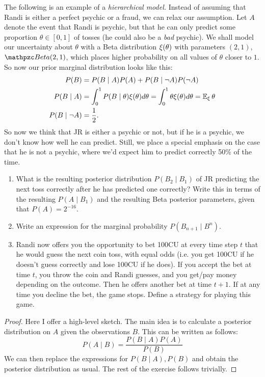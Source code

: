\documentclass[twoside,a4paper]{article}
\begin{document}
\begin{exercise}
  The following is an example of a \emph{hierarchical model.}
  Instead of assuming that Randi is either a perfect psychic or a fraud, we can relax our assumption. Let $A$ denote the event that Randi is psychic, but that he can only predict some proportion $\theta \in [0,1]$ of tosses (he could also be a \emph{bad} psychic).
We shall model our uncertainty about $\theta$ with a Beta distribution $\xi(\theta)$ with parameters $(2, 1)$, $\Beta(2,1)$, which places higher probability on all values of $\theta$ closer to $1$. So now our prior marginal distribution looks like this:
\begin{align}
  P(B) &= P(B \mid A) P(A) + P(B \mid \neg A) P(\neg A)\\
  P(B \mid A) &= \int_0^1 P(B \mid \theta) \xi(\theta) d\theta = \int_0^1 \theta \xi(\theta) d\theta = \mathop{\mbox{\ensuremath{\mathbb{E}}}}\nolimits_\xi \theta\\
  P(B \mid \neg A) &= \frac{1}{2}.
\end{align}
So now we think that JR is either a psychic or not, but if he is a psychic, we don't know how well he can predict. Still, we place a special emphasis on the case that he is not a psychic, where we'd expect him to predict correctly 50\% of the time.
\begin{enumerate}
\item What is the resulting posterior distribution $P(B_2 \mid B_1)$ of JR predicting the next toss correctly after he has predicted one correctly? Write this in terms of the resulting $P(A \mid B_1)$ and the resulting Beta posterior parameters, given that $P(A) = 2^{-16}$.
\item Write an expression for the marginal probability $P(B_{n+1} \mid B^n)$.
\item Randi now offers you the opportunity to bet 100CU at every time step $t$ that he would guess the next coin toss, with equal odds (i.e. you get 100CU if he doesn't guess correctly and lose 100CU if he does). If you accept the bet at time $t$, you throw the coin and Randi guesses, and you get/pay money depending on the outcome. Then he offers another bet at time $t+1$. If at any time you decline the bet, the game stops. Define a strategy for playing this game.
\end{enumerate}
\begin{proof}
  Here I offer a high-level sketch. The main idea is to calculate a posterior distribution on $A$ given the observations $B$. This can be written as follows:
  \[
    P(A \mid B)
    = \frac{P(B \mid A) P(A) }{P(B)}
  \]
  We can then replace the expressions for $P(B \mid A), P(B)$ and obtain the posterior distribution as usual. The rest of the exercise follows trivially.
\end{proof}

\end{exercise}








\fi
\end{document}
